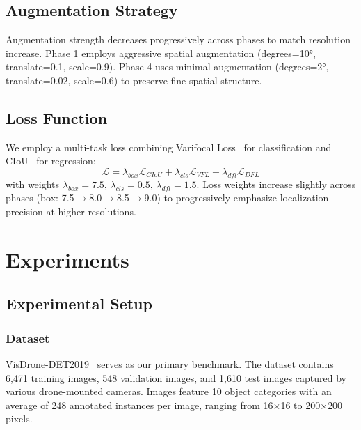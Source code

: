 \documentclass[preprint,12pt]{elsarticle}
\begin{document}
\subsection{Augmentation Strategy}

Augmentation strength decreases progressively across phases to match resolution
increase. Phase 1 employs aggressive spatial augmentation (degrees=10°,
translate=0.1, scale=0.9). Phase 4 uses minimal augmentation (degrees=2°,
translate=0.02, scale=0.6) to preserve fine spatial structure.

\subsection{Loss Function}

We employ a multi-task loss combining Varifocal Loss~\cite{varifocal-loss} for
classification and CIoU~\cite{ciou} for regression:
\begin{equation}
\mathcal{L} = \lambda_{box} \mathcal{L}_{CIoU} + \lambda_{cls} \mathcal{L}_{VFL}
              + \lambda_{dfl} \mathcal{L}_{DFL}
\end{equation}
with weights $\lambda_{box}=7.5$, $\lambda_{cls}=0.5$, $\lambda_{dfl}=1.5$.
Loss weights increase slightly across phases (box: 7.5$\to$8.0$\to$8.5$\to$9.0)
to progressively emphasize localization precision at higher resolutions.



\section{Experiments}
\label{sec:experiments}

\subsection{Experimental Setup}

\subsubsection{Dataset}

VisDrone-DET2019~\cite{visdrone2019} serves as our primary benchmark. The dataset
contains 6,471 training images, 548 validation images, and 1,610 test images
captured by various drone-mounted cameras. Images feature 10 object categories
with an average of 248 annotated instances per image, ranging from 16$\times$16
to 200$\times$200 pixels.
\end{document}
